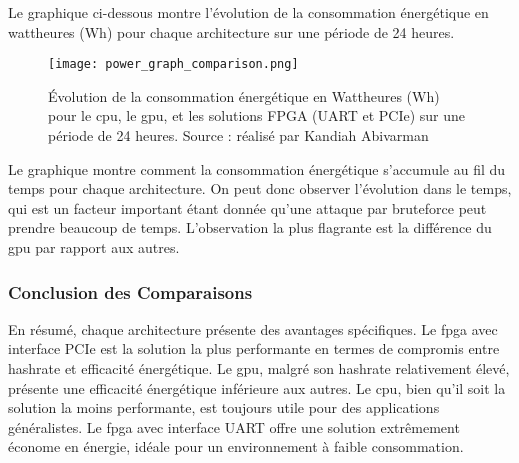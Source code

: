 Le graphique ci-dessous montre l'évolution de la consommation énergétique en wattheures (Wh) pour chaque architecture sur une période de 24 heures.

\begin{figure}[tbph!]
    \centering
    \texttt{[image: power\_graph\_comparison.png]}
    \caption[Évolution de la consommation énergétique sur 24 heures]{Évolution de la consommation énergétique en Wattheures (Wh) pour le \gls{cpu}, le \gls{gpu}, et les solutions FPGA (UART et PCIe) sur une période de 24 heures. Source : réalisé par Kandiah Abivarman}
    \label{fig:power_graph_comparison}
\end{figure}

Le graphique montre comment la consommation énergétique s'accumule au fil du temps pour chaque architecture.
On peut donc observer l'évolution dans le temps, qui est un facteur important étant donnée qu'une attaque par bruteforce peut prendre beaucoup de temps.
L'observation la plus flagrante est la différence du \gls{gpu} par rapport aux autres.

\subsubsection{Conclusion des Comparaisons}

En résumé, chaque architecture présente des avantages spécifiques. 
Le \gls{fpga} avec interface PCIe est la solution la plus performante en termes de compromis entre hashrate et efficacité énergétique. 
Le \gls{gpu}, malgré son hashrate relativement élevé, présente une efficacité énergétique inférieure aux autres. 
Le \gls{cpu}, bien qu'il soit la solution la moins performante, est toujours utile pour des applications généralistes. 
Le \gls{fpga} avec interface UART offre une solution extrêmement économe en énergie, idéale pour un environnement à faible consommation.